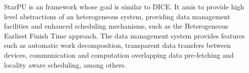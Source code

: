 

StarPU \citep{augonnet2011starpu} is an framework whose goal is similar to DICE. It amis to provide high level abstractions of an heterogeneous system, providing data management facilities and enhanced scheduling mechanisms, such as the Heterogeneous Earliest Finish Time approach. The data management system provides features such as automatic work decomposition, transparent data transfers between devices, communication and computation overlapping data pre-fetching and locality aware scheduling, among others.